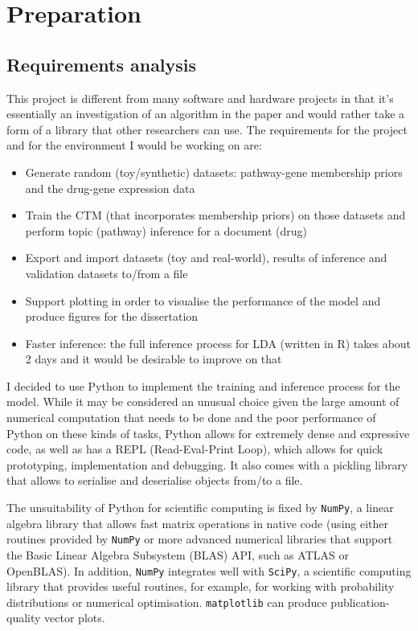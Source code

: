 \documentclass[12pt,a4paper,twoside,openright]{report}
\begin{document}
\chapter{Preparation}

\section{Requirements analysis}

This project is different from many software and hardware projects in that it's essentially an investigation of an algorithm in the paper and would rather take a form of a library that other researchers can use. The requirements for the project and for the environment I would be working on are:

\begin{itemize}[noitemsep]
\item Generate random (toy/synthetic) datasets: pathway-gene membership priors and the drug-gene expression data
\item Train the CTM (that incorporates membership priors) on those datasets and perform topic (pathway) inference for a document (drug)
\item Export and import datasets (toy and real-world), results of inference and validation datasets to/from a file
\item Support plotting in order to visualise the performance of the model and produce figures for the dissertation
\item Faster inference: the full inference process for LDA (written in R) takes about 2 days and it would be desirable to improve on that
\end{itemize}

I decided to use Python to implement the training and inference process for the model. While it may be considered an unusual choice given the large amount of numerical computation that needs to be done and the poor performance of Python on these kinds of tasks, Python allows for extremely dense and expressive code, as well as has a REPL (Read-Eval-Print Loop), which allows for quick prototyping, implementation and debugging. It also comes with a pickling library that allows to serialise and deserialise objects from/to a file. 

The unsuitability of Python for scientific computing is fixed by \texttt{NumPy}\cite{DBLP:journals/corr/abs-1102-1523}, a linear algebra library that allows fast matrix operations in native code (using either routines provided by \texttt{NumPy} or more advanced numerical libraries that support the Basic Linear Algebra Subsystem (BLAS) API, such as ATLAS or OpenBLAS). In addition, \texttt{NumPy} integrates well with \texttt{SciPy}, a scientific computing library that provides useful routines, for example, for working with probability distributions or numerical optimisation. \texttt{matplotlib} can produce publication-quality vector plots.
\end{document}
